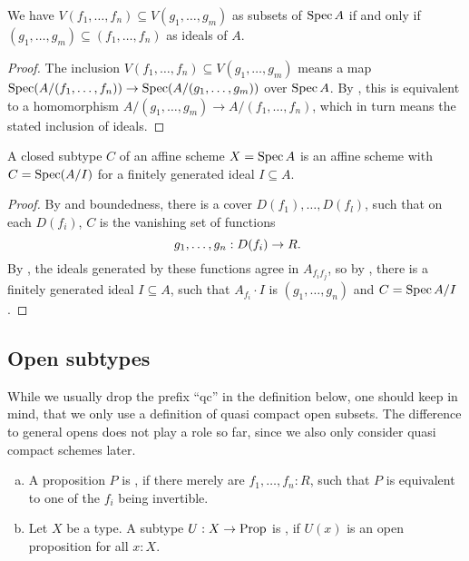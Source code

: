 \begin{lemma}%
  \label{ideals-embed-into-closed-subsets}
  We have $V(f_1, \dots, f_n) \subseteq V(g_1, \dots, g_m)$
  as subsets of $\operatorname{Spec} A$
  if and only if
  $(g_1, \dots, g_m) \subseteq (f_1, \dots, f_n)$
  as ideals of $A$.
\end{lemma}

\begin{proof}
  The inclusion $V(f_1, \dots, f_n) \subseteq V(g_1, \dots, g_m)$
  means a map $\operatorname{Spec} (A/(f_1, \dots, f_n)) \to \operatorname{Spec} (A/(g_1, \dots, g_m))$
  over $\operatorname{Spec} A$.
  By , this is equivalent to
  a homomorphism $A/(g_1, \dots, g_m) \to A/(f_1, \dots, f_n)$,
  which in turn means the stated inclusion of ideals.
\end{proof}

\begin{lemma}%
  \label{closed-subtype-affine}
  A closed subtype $C$ of an affine scheme $X=\operatorname{Spec} A$ is an affine scheme
  with $C=\operatorname{Spec} (A/I)$ for a finitely generated ideal $I\subseteq A$.
\end{lemma}

\begin{proof}
  By  and boundedness,
  there is a cover $D(f_1),\dots,D(f_l)$, such that
  on each $D(f_i)$, $C$ is the vanishing set of functions
  \[ g_1,\dots,g_n:D(f_i)\to R\rlap{.} \]
  By ,
  the ideals generated by these functions
  agree in $A_{f_i f_j}$,
  so by ,
  there is a finitely generated ideal $I\subseteq A$,
  such that $A_{f_i}\cdot I$ is $(g_1,\dots,g_n)$
  and $C=\operatorname{Spec} A/I$.
\end{proof}

\subsection{Open subtypes}

While we usually drop the prefix ``qc'' in the definition below,
one should keep in mind, that we only use a definition of quasi compact open subsets.
The difference to general opens does not play a role so far,
since we also only consider quasi compact schemes later.

\begin{definition}%
  \label{qc-open}
  \begin{enumerate}[(a)]
  \item A proposition $P$ is , if there merely are $f_1,\dots,f_n:R$,
    such that $P$ is equivalent to one of the $f_i$ being invertible.
  \item Let $X$ be a type.
    A subtype $U:X\to\mathrm{Prop}$ is , if $U(x)$ is an open proposition for all $x:X$.
  \end{enumerate}
\end{definition}

